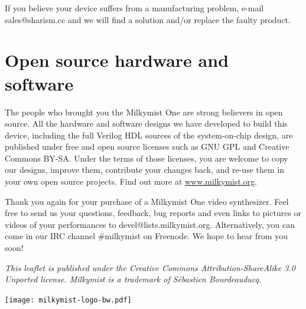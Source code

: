 \documentclass{leaflet}
\begin{document}
If you believe your device suffers from a manufacturing problem, e-mail sales@sharism.cc and we will find a solution and/or replace the faulty product.

\section{Open source hardware and software}
The people who brought you the Milkymist One are strong believers in open source. All the hardware and software designs we have developed to build this device, including the full Verilog HDL sources of the system-on-chip design, are published under free and open source licenses such as GNU GPL and Creative Commons BY-SA. Under the terms of those licenses, you are welcome to copy our designs, improve them, contribute your changes back, and re-use them in your own open source projects. Find out more at \url{www.milkymist.org}.

Thank you again for your purchase of a Milkymist One video synthesizer. Feel free to send us your questions, feedback, bug reports and even links to pictures or videos of your performances to \hbox{devel@lists.milkymist.org}. Alternatively, you can come in our IRC channel \#milkymist on Freenode. We hope to hear from you soon!

\textit{This leaflet is published under the Creative Commons Attribution-ShareAlike 3.0 Unported license. Milkymist is a trademark of S\'ebastien Bourdeauducq.}

\begin{center}
\texttt{[image: milkymist-logo-bw.pdf]}
\end{center}
\end{document}
